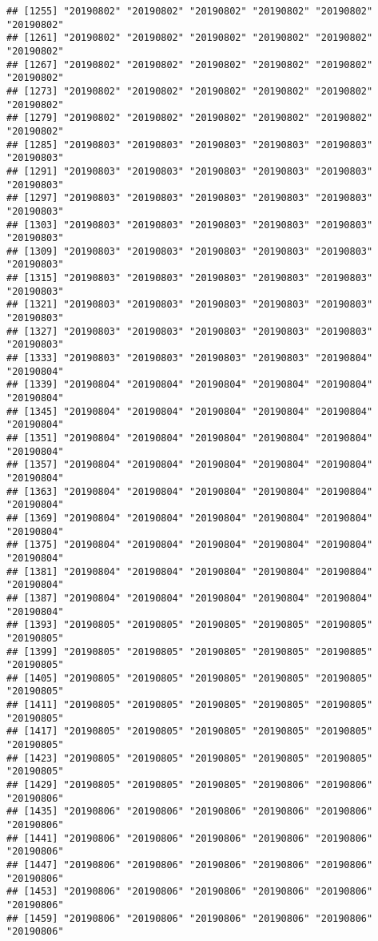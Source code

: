 \documentclass[]{article}
\begin{document}
\begin{verbatim}
## [1255] "20190802" "20190802" "20190802" "20190802" "20190802" "20190802"
## [1261] "20190802" "20190802" "20190802" "20190802" "20190802" "20190802"
## [1267] "20190802" "20190802" "20190802" "20190802" "20190802" "20190802"
## [1273] "20190802" "20190802" "20190802" "20190802" "20190802" "20190802"
## [1279] "20190802" "20190802" "20190802" "20190802" "20190802" "20190802"
## [1285] "20190803" "20190803" "20190803" "20190803" "20190803" "20190803"
## [1291] "20190803" "20190803" "20190803" "20190803" "20190803" "20190803"
## [1297] "20190803" "20190803" "20190803" "20190803" "20190803" "20190803"
## [1303] "20190803" "20190803" "20190803" "20190803" "20190803" "20190803"
## [1309] "20190803" "20190803" "20190803" "20190803" "20190803" "20190803"
## [1315] "20190803" "20190803" "20190803" "20190803" "20190803" "20190803"
## [1321] "20190803" "20190803" "20190803" "20190803" "20190803" "20190803"
## [1327] "20190803" "20190803" "20190803" "20190803" "20190803" "20190803"
## [1333] "20190803" "20190803" "20190803" "20190803" "20190804" "20190804"
## [1339] "20190804" "20190804" "20190804" "20190804" "20190804" "20190804"
## [1345] "20190804" "20190804" "20190804" "20190804" "20190804" "20190804"
## [1351] "20190804" "20190804" "20190804" "20190804" "20190804" "20190804"
## [1357] "20190804" "20190804" "20190804" "20190804" "20190804" "20190804"
## [1363] "20190804" "20190804" "20190804" "20190804" "20190804" "20190804"
## [1369] "20190804" "20190804" "20190804" "20190804" "20190804" "20190804"
## [1375] "20190804" "20190804" "20190804" "20190804" "20190804" "20190804"
## [1381] "20190804" "20190804" "20190804" "20190804" "20190804" "20190804"
## [1387] "20190804" "20190804" "20190804" "20190804" "20190804" "20190804"
## [1393] "20190805" "20190805" "20190805" "20190805" "20190805" "20190805"
## [1399] "20190805" "20190805" "20190805" "20190805" "20190805" "20190805"
## [1405] "20190805" "20190805" "20190805" "20190805" "20190805" "20190805"
## [1411] "20190805" "20190805" "20190805" "20190805" "20190805" "20190805"
## [1417] "20190805" "20190805" "20190805" "20190805" "20190805" "20190805"
## [1423] "20190805" "20190805" "20190805" "20190805" "20190805" "20190805"
## [1429] "20190805" "20190805" "20190805" "20190806" "20190806" "20190806"
## [1435] "20190806" "20190806" "20190806" "20190806" "20190806" "20190806"
## [1441] "20190806" "20190806" "20190806" "20190806" "20190806" "20190806"
## [1447] "20190806" "20190806" "20190806" "20190806" "20190806" "20190806"
## [1453] "20190806" "20190806" "20190806" "20190806" "20190806" "20190806"
## [1459] "20190806" "20190806" "20190806" "20190806" "20190806" "20190806"

\end{verbatim}
\end{document}

